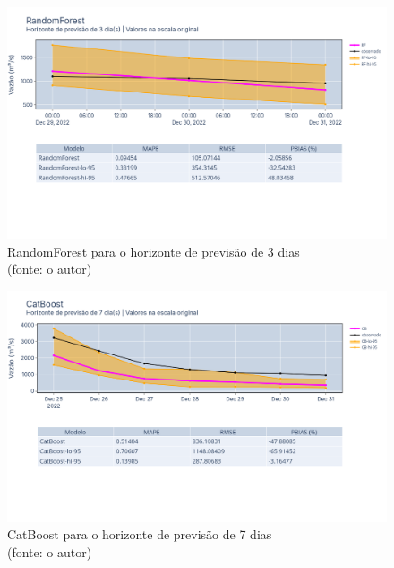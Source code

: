 \begin{figure}[!h]
	\centering
	\includegraphics[scale=0.33]{Figuras/jequiti/resultados/RandomForest_fh3.png}
	\caption{RandomForest para o horizonte de previsão de 3 dias\\(fonte: o autor)}
	\label{fig:jequiti_RandomForest_fh3}
\end{figure}

\begin{figure}[!h]
	\centering
	\includegraphics[scale=0.33]{Figuras/jequiti/resultados/CatBoost_fh7.png}
	\caption{CatBoost para o horizonte de previsão de 7 dias\\(fonte: o autor)}
	\label{fig:jequiti_CatBoostRegressor_fh7}
\end{figure}

